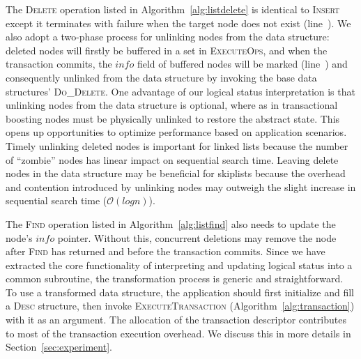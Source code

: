 \documentclass[]{sig-alternate-05-2015}
\begin{document}
The \textsc{Delete} operation listed in Algorithm~\ref{alg:listdelete} is identical to \textsc{Insert} except it terminates with failure when the target node does not exist (line~).
We also adopt a two-phase process for unlinking nodes from the data structure: deleted nodes will firstly be buffered in a set in \textsc{ExecuteOps}, and when the transaction commits, the $info$ field of buffered nodes will be marked (line~) and consequently unlinked from the data structure by invoking the base data structures' \textsc{Do\_Delete}.
One advantage of our logical status interpretation is that unlinking nodes from the data structure is optional, where as in transactional boosting nodes must be physically unlinked to restore the abstract state. 
This opens up opportunities to optimize performance based on application scenarios.
Timely unlinking deleted nodes is important for linked lists because the number of ``zombie'' nodes has linear impact on sequential search time.
Leaving delete nodes in the data structure may be beneficial for skiplists because the overhead and contention introduced by unlinking nodes may outweigh the slight increase in sequential search time ($\mathcal{O}(log{}n)$).

The \textsc{Find} operation listed in Algorithm~\ref{alg:listfind} also needs to update the node's $info$ pointer.
Without this, concurrent deletions may remove the node after \textsc{Find} has returned and before the transaction commits.
Since we have extracted the core functionality of interpreting and updating logical status into a common subroutine, the transformation process is generic and straightforward.
To use a transformed data structure, the application should first initialize and fill a \textsc{Desc} structure, then invoke \textsc{ExecuteTransaction} (Algorithm~\ref{alg:transaction}) with it as an argument.
The allocation of the transaction descriptor contributes to most of the transaction execution overhead.
We discuss this in more details in Section~\ref{sec:experiment}.
\end{document}
